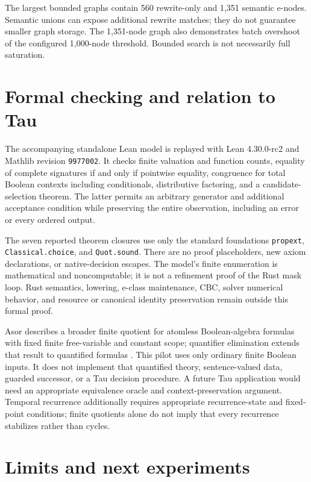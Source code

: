 \documentclass[11pt]{article}
\begin{document}
The largest bounded graphs contain 560 rewrite-only and 1,351 semantic
e-nodes. Semantic unions can expose additional rewrite matches; they do not
guarantee smaller graph storage. The 1,351-node graph also demonstrates batch
overshoot of the configured 1,000-node threshold. Bounded search is not
necessarily full saturation.

\section{Formal checking and relation to Tau}

The accompanying standalone Lean model is replayed with Lean 4.30.0-rc2 and
Mathlib revision \texttt{9977002}. It checks finite valuation and function
counts, equality of complete signatures if and only if pointwise equality,
congruence for total Boolean contexts including conditionals, distributive
factoring, and a candidate-selection theorem. The latter permits an arbitrary
generator and additional acceptance condition while preserving the entire
observation, including an error or every ordered output.

The seven reported theorem closures use only the standard foundations
\texttt{propext}, \texttt{Classical.choice}, and \texttt{Quot.sound}.
There are no proof placeholders, new axiom declarations, or native-decision
escapes. The model's finite enumeration is mathematical and noncomputable;
it is not a refinement proof of the Rust mask loop. Rust semantics, lowering,
e-class maintenance, CBC, solver numerical behavior, and resource or canonical
identity preservation remain outside this formal proof.

Asor describes a broader finite quotient for atomless Boolean-algebra formulas
with fixed finite free-variable and constant scope; quantifier elimination
extends that result to quantified formulas \cite{asor}. This pilot uses only
ordinary finite Boolean inputs. It does not implement that quantified theory,
sentence-valued data, guarded successor, or a Tau decision procedure.
A future Tau application would need an appropriate equivalence oracle and
context-preservation argument. Temporal recurrence additionally requires
appropriate recurrence-state and fixed-point conditions; finite quotients
alone do not imply that every recurrence stabilizes rather than cycles.

\section{Limits and next experiments}
\end{document}

